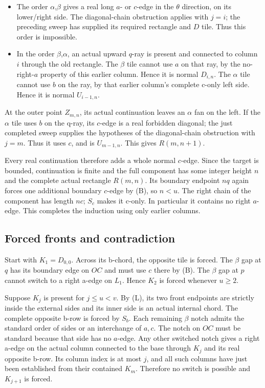 \documentclass[
  11pt,
  a4paper,
]{article}
\providecommand{\tightlist}{%
  \setlength{\itemsep}{0pt}\setlength{\parskip}{0pt}}
\begin{document}
\begin{itemize}
\tightlist
\item
  The order \(\alpha\),\(\beta\) gives a real long \(a\)- or \(c\)-edge
  in the \(\theta\) direction, on its lower/right side. The
  diagonal-chain obstruction applies with \(j=i\); the preceding sweep
  has supplied its required rectangle and \(D\) tile. Thus this order is
  impossible.
\item
  In the order \(\beta\),\(\alpha\), an actual upward \(q\)-ray is
  present and connected to column \(i\) through the old rectangle. The
  \(\beta\) tile cannot use \(a\) on that ray, by the no-right-\(a\)
  property of this earlier column. Hence it is normal \(D_{i,n}\). The
  \(\alpha\) tile cannot use \(b\) on the ray, by that earlier column's
  complete c-only left side. Hence it is normal \(U_{i-1,n}\).
\end{itemize}

At the outer point \(Z_{m,n}\), its actual continuation leaves an
\(\alpha\) fan on the left. If the \(\alpha\) tile uses \(b\) on the
q-ray, its \(c\)-edge is a real forbidden diagonal; the just completed
sweep supplies the hypotheses of the diagonal-chain obstruction with
\(j=m\). Thus it uses \(c\), and is \(U_{m-1,n}\). This gives
\(R(m,n+1)\).

Every real continuation therefore adds a whole normal \(c\)-edge. Since
the target is bounded, continuation is finite and the full component has
some integer height \(n\) and the complete actual rectangle \(R(m,n)\).
Its boundary endpoint \(nq\) again forces one additional boundary
\(c\)-edge by (B), so \(n<u\). The right chain of the component has
length \(nc\); \(S_c\) makes it c-only. In particular it contains no
right \(a\)-edge. This completes the induction using only earlier
columns.

\hypertarget{forced-fronts-and-contradiction}{%
\subsection{Forced fronts and
contradiction}\label{forced-fronts-and-contradiction}}

Start with \(K_1=D_{0,0}\). Across its b-chord, the opposite tile is
forced. The \(\beta\) gap at \(q\) has its boundary edge on \(OC\) and
must use \(c\) there by (B). The \(\beta\) gap at \(p\) cannot switch to
a right a-edge on \(L_1\). Hence \(K_2\) is forced whenever \(u\ge2\).

Suppose \(K_j\) is present for \(j\le u<v\). By (L), its two front
endpoints are strictly inside the external sides and its inner side is
an actual internal chord. The complete opposite b-row is forced by
\(S_b\). Each remaining \(\beta\) notch admits the standard order of
sides or an interchange of \(a,c\). The notch on \(OC\) must be standard
because that side has no \(a\)-edge. Any other switched notch gives a
right a-edge on the actual column connected to the base through \(K_j\)
and its real opposite b-row. Its column index is at most \(j\), and all
such columns have just been established from their contained \(K_m\).
Therefore no switch is possible and \(K_{j+1}\) is forced.
\end{document}

